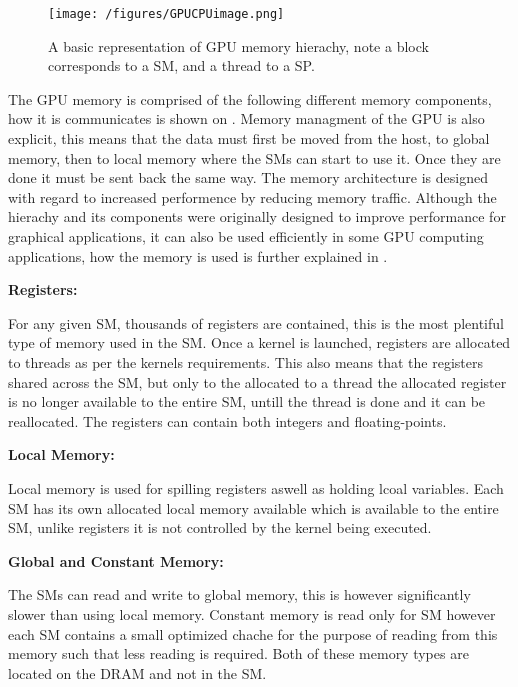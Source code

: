 \begin{figure}[h!]
\centering
 \texttt{[image: /figures/GPUCPUimage.png]} %
\caption{A basic representation of GPU memory hierachy, note a block corresponds to a SM, and a thread to a SP.}\label{image:GPUMemory} 
\end{figure}
The GPU memory is comprised of the following different memory components, how it is communicates is shown on . 
Memory managment of the GPU is also explicit, this means that the data must first be moved from the host, to global memory, then to local memory where the SMs can start to use it. 
Once they are done it must be sent back the same way.
The memory architecture is designed with regard to increased performence by reducing memory traffic.
Although the hierachy and its components were originally designed to improve performance for graphical applications, it can also be used efficiently in some GPU computing applications, how the memory is used is further explained in . %

\textbf{Registers:}

For any given SM, thousands of registers are contained, this is the most plentiful type of memory used in the SM. 
Once a kernel is launched, registers are allocated to threads as per the kernels requirements.
This also means that the registers shared across the SM, but only to the allocated to a thread the allocated register is no longer available to the entire SM, untill the thread is done and it can be reallocated.
The registers can contain both integers and floating-points.

\textbf{Local Memory:}

Local memory is used for spilling registers aswell as holding lcoal variables.
Each SM has its own allocated local memory available which is available to the entire SM, unlike registers it is not controlled by the kernel being executed.

\textbf{Global and Constant Memory:}

The SMs can read and write to global memory, this is however significantly slower than using local memory. %
Constant memory is read only for SM however each SM contains a small optimized chache for the purpose of reading from this memory such that less reading is required. Both of these memory types are located on the DRAM and not in the SM.

